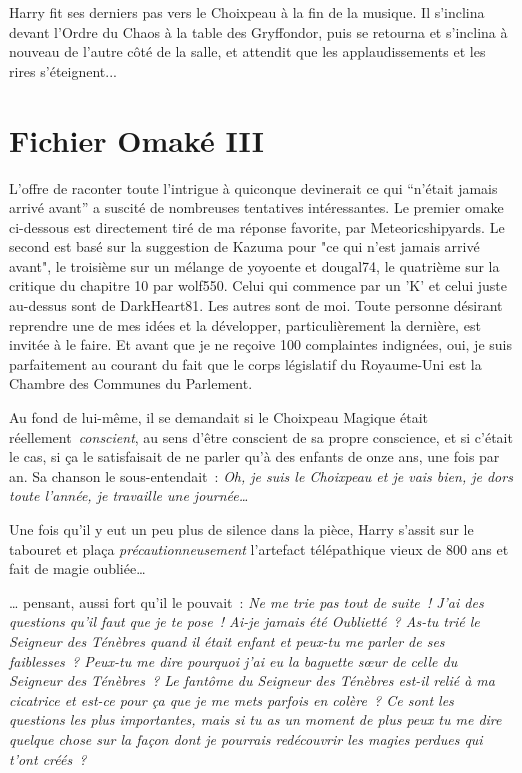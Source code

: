 {Harry fit ses derniers pas vers le Choixpeau à la fin de la musique. Il s'inclina devant l'Ordre du Chaos à la table des Gryffondor, puis se retourna et s'inclina à nouveau de l'autre côté de la salle, et attendit que les applaudissements et les rires s'éteignent...

\section{Fichier Omaké III}

L'offre de raconter toute l'intrigue à quiconque devinerait ce qui “n'était jamais arrivé avant” a suscité de nombreuses tentatives intéressantes. Le premier omake ci-dessous est directement tiré de ma réponse favorite, par Meteoricshipyards. Le second est basé sur la suggestion de Kazuma pour "ce qui n'est jamais arrivé avant", le troisième sur un mélange de yoyoente et dougal74, le quatrième sur la critique du chapitre 10 par wolf550. Celui qui commence par un 'K' et celui juste au-dessus sont de DarkHeart81. Les autres sont de moi. Toute personne désirant reprendre une de mes idées et la développer, particulièrement la dernière, est invitée à le faire. Et avant que je ne reçoive 100 complaintes indignées, oui, je suis parfaitement au courant du fait que le corps législatif du Royaume-Uni est la Chambre des Communes du Parlement.

\later

Au fond de lui-même, il se demandait si le Choixpeau Magique était réellement~\emph{conscient}, au sens d'être conscient de sa propre conscience, et si c'était le cas, si ça le satisfaisait de ne parler qu'à des enfants de onze ans, une fois par an. Sa chanson le sous-entendait~: \emph{Oh, je suis le Choixpeau et je vais bien, je dors toute l'année, je travaille une journée…}

Une fois qu'il y eut un peu plus de silence dans la pièce, Harry s'assit sur le tabouret et plaça \emph{précautionneusement} l'artefact télépathique vieux de 800 ans et fait de magie oubliée…

… pensant, aussi fort qu'il le pouvait~: \emph{Ne me trie pas tout de suite~! J'ai des questions qu'il faut que je te pose~! Ai-je jamais été Oublietté~? As-tu trié le Seigneur des Ténèbres quand il était enfant et peux-tu me parler de ses faiblesses~? Peux-tu me dire pourquoi j'ai eu la baguette sœur de celle du Seigneur des Ténèbres~? Le fantôme du Seigneur des Ténèbres est-il relié à ma cicatrice et est-ce pour ça que je me mets parfois en colère~? Ce sont les questions les plus importantes, mais si tu as un moment de plus peux tu me dire quelque chose sur la façon dont je pourrais redécouvrir les magies perdues qui t'ont créés~?}

}

